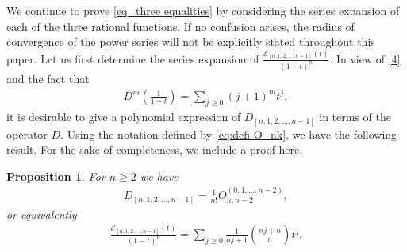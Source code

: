 \documentclass[12pt]{article}
\newtheorem{prop}[thm]{Proposition}
\numberwithin{equation}{section}
\begin{document}
We continue to prove \eqref{eq_three equalities} by considering the series expansion of each of the three rational functions.  
If no confusion arises, the radius of convergence of the power series will not be explicitly stated throughout this paper. 
Let us first determine the series expansion of 
$\frac{{\mathcal{E}}_{[n, 1,2,\ldots,n-1]}(t)}{(1-t)^{n}}$. In view of \eqref{4} and the fact that
\begin{align}\label{eq-Dm}
D^m\left(\frac{1}{1-t}\right)
=\sum_{j\geq 0}(j+1)^mt^{j},
\end{align}
it is desirable to give a polynomial expression of $D_{[n, 1,2,\ldots,n-1]}$ in terms of the operator $D$. Using the notation defined by \eqref{eq:defi-O_nk}, we have the following result. For the sake of completeness, we include a proof here.
\begin{prop}\label{thm_w}
    For $n \geq 2$ we have
\begin{align}\label{eq-operator-identity}
    D_{[n, 1,2,\ldots,n-1]}=\frac{1}{n!}O^{{(0,1,\ldots,n-2)}}_{n,n-2},
\end{align}
or equivalently
\begin{align*}%
\frac{{\mathcal{E}}_{[n, 1,2,\ldots,n-1]}(t)}{(1-t)^{n}}=\sum_{j\geq 0} \frac{1}{nj+1}\binom{nj+n}{n}t^j. %
\end{align*}
\end{prop}
\end{document}
